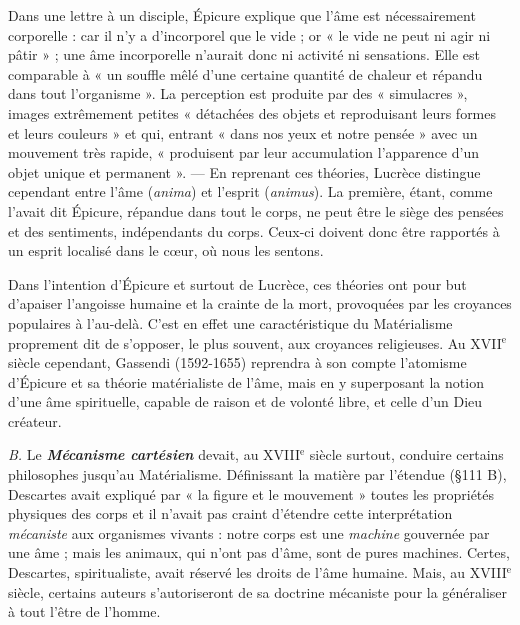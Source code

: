 \vspace{0.24cm}
{\footnotesize Dans une lettre à un disciple, Épicure explique que l’âme est nécessairement
corporelle : car il n'y a d'incorporel que le vide ; or « le vide ne peut ni
agir ni pâtir » ; une âme incorporelle n'aurait donc ni activité ni sensations.
Elle est comparable à « un souffle mêlé d’une certaine quantité de chaleur
et répandu dans tout l'organisme ». La perception est produite par des
« simulacres », images extrêmement petites « détachées des objets et reproduisant
leurs formes et leurs couleurs » et qui, entrant « dans nos yeux et
notre pensée » avec un mouvement très rapide, « produisent par leur accumulation
l'apparence d’un objet unique et permanent ». — En reprenant ces
théories, Lucrèce distingue cependant entre l'âme ({\it anima}) et l'esprit
({\it animus}). La première, étant, comme l'avait dit Épicure, répandue dans
tout le corps, ne peut être le siège des pensées et des sentiments, indépendants
du corps. Ceux-ci doivent donc être rapportés à un esprit localisé dans le
cœur, où nous les sentons.}
\vspace{0.31cm}


Dans l'intention d’Épicure et surtout de Lucrèce, ces théories ont
pour but d’apaiser l'angoisse humaine et la crainte de la mort, provoquées
par les croyances populaires à l’au-delà. C’est en effet une
caractéristique du Matérialisme proprement dit de s'opposer, le plus
souvent, aux croyances religieuses. Au {\footnotesize XVII}$^\text{e}$ siècle cependant,
Gassendi (1592-1655) reprendra à son compte l’atomisme d’Épicure
et sa théorie matérialiste de l’âme, mais en y superposant la notion
d’une âme spirituelle, capable de raison et de volonté libre, et celle
d’un Dieu créateur. 

{\it B.} Le \textbf{\textit {Mécanisme cartésien}} devait, au {\footnotesize XVIII}$^\text{e}$ siècle surtout,
conduire certains philosophes jusqu’au Matérialisme. Définissant la
matière par l'étendue (\S 111 B), Descartes avait expliqué par « la
figure et le mouvement » toutes les propriétés physiques des corps
et il n’avait pas craint d’étendre cette interprétation {\it mécaniste} aux
organismes vivants : notre corps est une {\it machine} gouvernée par une
âme ; mais les animaux, qui n’ont pas d’âme, sont de pures machines.
Certes, Descartes, spiritualiste, avait réservé les droits de l’âme
humaine. Mais, au {\footnotesize XVIII}$^\text{e}$ siècle, certains auteurs s’autoriseront de
sa doctrine mécaniste pour la généraliser à tout l’être de l’homme.

